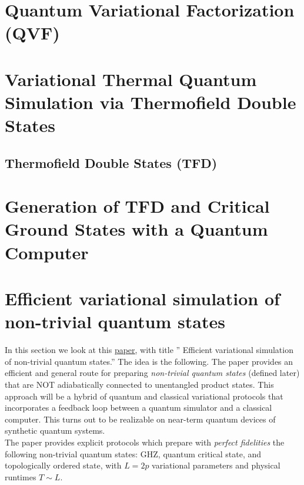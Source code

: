 \documentclass{book}
\theoremstyle{definition}
\begin{document}
\newpage

\section{Quantum Variational Factorization (QVF)}

\newpage



\section{Variational Thermal Quantum Simulation via Thermofield Double States}



\subsection{Thermofield Double States (TFD)}


\newpage



\section{Generation of TFD and Critical Ground States with a Quantum Computer }



\newpage






\section{Efficient variational simulation of non-trivial quantum states}


In this section we look at this \href{https://arxiv.org/pdf/1803.00026.pdf}{\underline{paper}}, with title '' Efficient variational simulation of non-trivial quantum states.'' The idea is the following. The paper provides an efficient and general route for preparing \textit{non-trivial quantum states} (defined later) that are NOT adiabatically connected to unentangled product states. This approach will be a hybrid of quantum and classical variational protocols that incorporates a feedback loop between a quantum simulator and a classical computer. This turns out to be realizable on near-term quantum devices of synthetic quantum systems. \\

The paper provides explicit protocols which prepare with \textit{perfect fidelities} the following non-trivial quantum states: GHZ, quantum critical state, and topologically ordered state, with $L=2p$ variational parameters and physical runtimes $T \sim L$. \\
\end{document}
